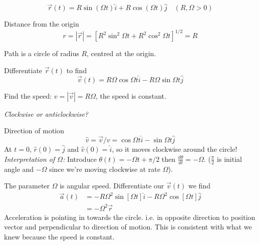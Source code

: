 \documentclass[10pt]{scrartcl}
\begin{document}
\begin{example}
\[\vec{r}(t) = R\sin(\Omega t)\hat{i} + R\cos(\Omega t)\hat{j}\quad (R,\Omega >0)\]

Distance from the origin 
\[r = |\vec{r}| = [R^2\sin^2\Omega t + R^2\cos^2\Omega t]^{1/2} = R\]

Path is a circle of radius $R$, centred at the origin. 

\begin{center}
\end{center}

Differentiate $\vec{r}(t)$ to find 
\[\vec{v}(t) = R\Omega \cos \Omega t\hat{i} - R\Omega \sin \Omega t \hat{j}\]

Find the speed: $v = |\vec{v}| = R\Omega$, the speed is constant. 

\emph{Clockwise or anticlockwise?}

Direction of motion
\[\hat{v}= \vec{v}/v = \cos \Omega t\hat{i} - \sin\Omega t \hat{j}\]
At $t = 0$, $\hat{r}(0) = \hat{j}$ and $\hat{v}(0) = \hat{i}$, so it moves clockwise around the circle!\\

\emph{Interpretation of $\Omega$:} Introduce $\theta(t) = -\Omega t + \pi/2$ then $\frac{d\theta}{dt} = - \Omega$. ($\frac{\pi}{2}$ is initial angle and $-\Omega$ since we're moving clockwise at rate $\Omega$).

The parameter $\Omega$ is angular speed. Differentiate our $\vec{v}(t)$ we find
\[\begin{aligned}
\vec{a}(t) &= -R\Omega^2 \sin[\Omega t]\hat{i} - R\Omega^2\cos[\Omega t]\hat{j}\\
&= -\Omega^2 \vec{r}	
\end{aligned}
\]
Acceleration is pointing in towards the circle. i.e. in opposite direction to position vector and perpendicular to direction of motion. This is consistent with what we knew because the speed is constant.
\end{example}
\end{document}
